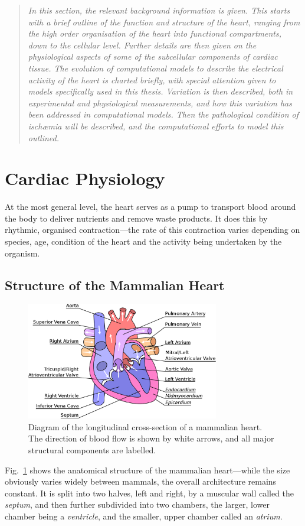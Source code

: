 \documentclass[../thesis-main.tex]{subfiles}
\begin{document}
\label{ch:litreview}
  \begin{quote}
   \emph{In this section, the relevant background information is given. This starts with a brief outline of the function and structure of the heart, ranging from the high order organisation of the heart into functional compartments, down to the cellular level. Further details are then given on the physiological aspects of some of the subcellular components of cardiac tissue. The evolution of computational models to describe the electrical activity of the heart is charted briefly, with special attention given to models specifically used in this thesis. Variation is then described, both in experimental and physiological measurements, and how this variation has been addressed in computational models. Then the pathological condition of isch\ae mia will be described, and the computational efforts to model this outlined.}
  \end{quote}


 \section{Cardiac Physiology}
 \label{sec:physiology}
 At the most general level, the heart serves as a pump to transport blood around the body to deliver nutrients and remove waste products. It does this by rhythmic, organised contraction---the rate of this contraction varies depending on species, age, condition of the heart and the activity being undertaken by the organism.
 
 \subsection{Structure of the Mammalian Heart}
 \label{subsec:heart-structure}
 \begin{figure}
  \centering
  \includegraphics[width=0.75\textwidth]{heart_labels}
  \caption[Structure of the mammalian heart]{Diagram of the longitudinal cross-section of a mammalian heart. The direction of blood flow is shown by white arrows, and all major structural components are labelled.}
  \label{fig:heart-structure}
 \end{figure}
 Fig.~\ref{fig:heart-structure} shows the anatomical structure of the mammalian heart---while the size obviously varies widely between mammals, the overall architecture remains constant. It is split into two halves, left and right, by a muscular wall called the \emph{septum}, and then further subdivided into two chambers, the larger, lower chamber being a \emph{ventricle}, and the smaller, upper chamber called an \emph{atrium}.
 
\end{document}
